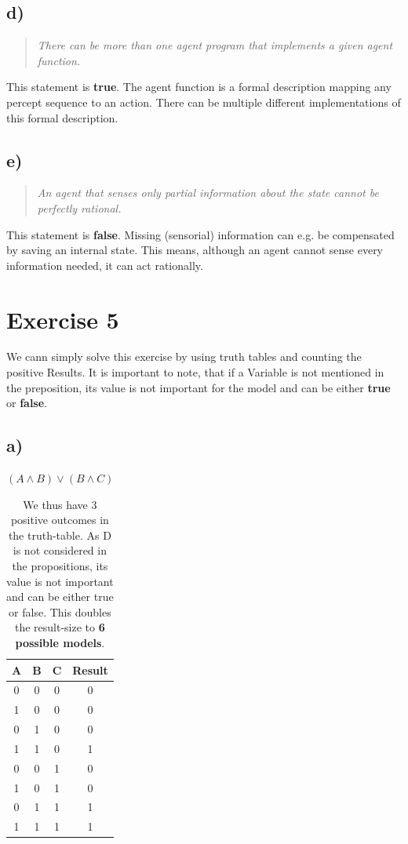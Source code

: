 \documentclass[11pt]{article}
\begin{document}
\subsection*{d)}
\begin{quotation}\noindent
\textit{There can be more than one agent program that implements a given agent function.}
\end{quotation}
\noindent
This statement is \textbf{true}. The agent function is a formal description mapping any percept sequence to an action. There can be multiple different implementations of this formal description.

\subsection*{e)}
\begin{quotation}\noindent
\textit{An agent that senses only partial information about the state cannot be perfectly rational.}
\end{quotation}
\noindent
This statement is \textbf{false}. Missing (sensorial) information can e.g. be compensated by saving an internal state. This means, although an agent cannot sense every information needed, it can act rationally.

\newpage

\section*{Exercise 5}
We cann simply solve this exercise by using truth tables and counting the positive Results. It is important to note, that if a Variable is not mentioned in the preposition, its value is not important for the model and can be either \textbf{true} or \textbf{false}.

\subsection*{a)} 
$(A \wedge B) \vee (B \wedge C)$
\begin{table}[h]
  \begin{tabular}{c|c|c||c}
    A & B & C & Result\\
    \hline
    0 & 0 & 0 & 0 \\
    1 & 0 & 0 & 0 \\
    0 & 1 & 0 & 0 \\
    1 & 1 & 0 & 1 \\
    0 & 0 & 1 & 0 \\
    1 & 0 & 1 & 0 \\
    0 & 1 & 1 & 1 \\
    1 & 1 & 1 & 1
  \end{tabular}
  \caption*{We thus have 3 positive outcomes in the truth-table. As D is not considered in the propositions, its value is not important and can be either true or false. This doubles the result-size to \textbf{6 possible models}.}
\end{table}
\end{document}
